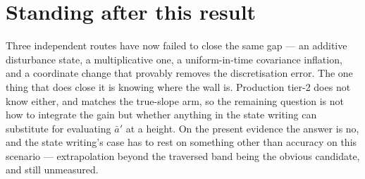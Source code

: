 \documentclass[11pt,a4paper,fontset=none]{ctexart}
\newcommand{\ba}{\bar{a}}
\begin{document}
\section*{Standing after this result}

Three independent routes have now failed to close the same gap --- an additive
disturbance state, a multiplicative one, a uniform-in-time covariance inflation,
and a coordinate change that provably removes the discretisation error. The one
thing that does close it is knowing where the wall is. Production tier-2 does
not know either, and matches the true-slope arm, so the remaining question is
not how to integrate the gain but whether anything in the state writing can
substitute for evaluating $\ba'$ at a height. On the present evidence the answer
is no, and the state writing's case has to rest on something other than accuracy
on this scenario --- extrapolation beyond the traversed band being the obvious
candidate, and still unmeasured.
\end{document}
